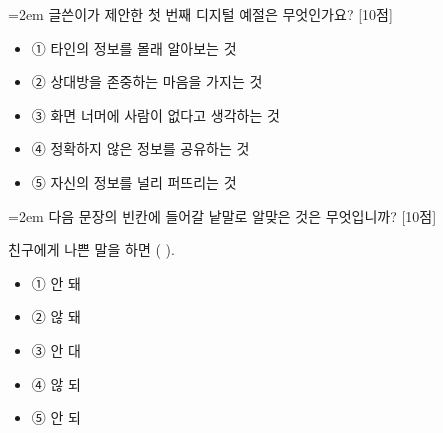 \documentclass[12pt,a4paper]{article}
\newcommand{\qnum}[1]{%
  \tikz[baseline=(num.base)]{%
    \node[circle, fill=numCircle, text=white, inner sep=0pt,
          minimum size=18pt, font=\small\bfseries] (num) {#1};%
  }%
}
\newcommand{\pts}[1]{%
  \hfill\textcolor{ptsBadge}{[#1점]}%
}
\begin{document}
\vspace{4mm}
\begin{minipage}{\columnwidth}
{\hangindent=2em
\qnum{26}\enspace 글쓴이가 제안한 첫 번째 디지털 예절은 무엇인가요? \pts{10}
\par}

\vspace{3mm}
\begin{itemize}[leftmargin=2.5em, labelsep=0.3em, label={}, itemsep=4pt, parsep=1pt, topsep=0pt]
  \item ① 타인의 정보를 몰래 알아보는 것
  \item ② 상대방을 존중하는 마음을 가지는 것
  \item ③ 화면 너머에 사람이 없다고 생각하는 것
  \item ④ 정확하지 않은 정보를 공유하는 것
  \item ⑤ 자신의 정보를 널리 퍼뜨리는 것
\end{itemize}
\end{minipage}
\vspace{4mm}

\vspace{4mm}
\begin{minipage}{\columnwidth}
{\hangindent=2em
\qnum{27}\enspace 다음 문장의 빈칸에 들어갈 낱말로 알맞은 것은 무엇입니까? \pts{10}
\par}

\vspace{3mm}
\begin{tcolorbox}[bogi]
친구에게 나쁜 말을 하면 (          ).
\end{tcolorbox}
\vspace{3mm}
\begin{itemize}[leftmargin=2.5em, labelsep=0.3em, label={}, itemsep=4pt, parsep=1pt, topsep=0pt]
  \item ① 안 돼
  \item ② 않 돼
  \item ③ 안 대
  \item ④ 않 되
  \item ⑤ 안 되
\end{itemize}
\end{minipage}
\vspace{4mm}
\end{document}
